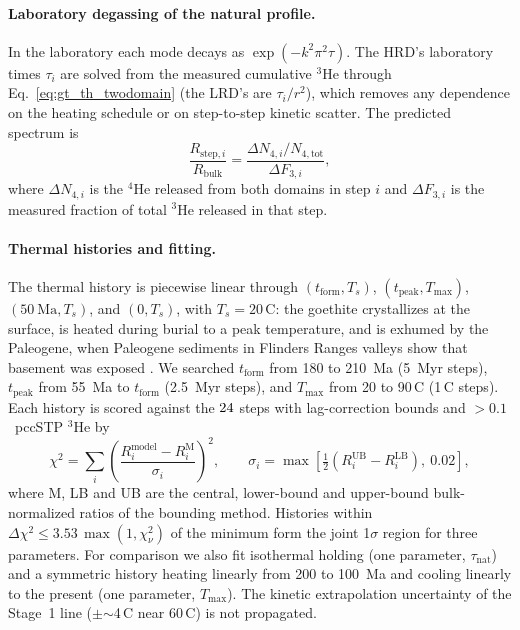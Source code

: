 \paragraph{Laboratory degassing of the natural profile.}
In the laboratory each mode decays as $\exp(-k^2\pi^2\tau)$. The HRD's
laboratory times $\tau_i$ are solved from the measured cumulative $^3$He
through Eq.~\ref{eq:gt_th_twodomain} (the LRD's are $\tau_i/r^2$), which removes
any dependence on the heating schedule or on step-to-step kinetic scatter. The
predicted spectrum is
\begin{equation}
  \frac{R_{\mathrm{step},i}}{R_\mathrm{bulk}} =
  \frac{\Delta N_{4,i}/N_{4,\mathrm{tot}}}{\Delta F_{3,i}},
  \label{eq:gt_th_ratio}
\end{equation}
where $\Delta N_{4,i}$ is the $^4$He released from both domains in step $i$
and $\Delta F_{3,i}$ is the measured fraction of total $^3$He released in that
step.

\paragraph{Thermal histories and fitting.}
The thermal history is piecewise linear through
$(t_\mathrm{form}, T_s)$, $(t_\mathrm{peak}, T_\mathrm{max})$, $(50~\mathrm{Ma}, T_s)$,
and $(0, T_s)$, with $T_s = 20$\,\textdegree C: the goethite crystallizes at
the surface, is heated during burial to a peak temperature, and is exhumed by
the Paleogene, when Paleogene sediments in Flinders Ranges valleys show that
basement was exposed \citep{mitchell1998}. We searched $t_\mathrm{form}$ from
180 to 210~Ma (5~Myr steps), $t_\mathrm{peak}$ from 55~Ma to $t_\mathrm{form}$
(2.5~Myr steps), and $T_\mathrm{max}$ from 20 to 90\,\textdegree C (1\,\textdegree C
steps). Each history is scored against the $24$ steps with
lag-correction bounds and $>0.1$~pccSTP $^3$He by
\begin{equation}
  \chi^2 = \sum_i\left(\frac{R^{\mathrm{model}}_i - R^{\mathrm{M}}_i}{\sigma_i}\right)^2,
  \qquad \sigma_i = \max\!\left[\tfrac{1}{2}\left(R^{\mathrm{UB}}_i-R^{\mathrm{LB}}_i\right),\ 0.02\right],
  \label{eq:gt_th_chi2}
\end{equation}
where M, LB and UB are the central, lower-bound and upper-bound
bulk-normalized ratios of the bounding method. Histories within
$\Delta\chi^2 \le 3.53\,\max(1,\chi^2_\nu)$ of the minimum form the joint
1$\sigma$ region for three parameters. For comparison we also fit isothermal
holding (one parameter, $\tau_\mathrm{nat}$) and a symmetric history heating
linearly from 200 to 100~Ma and cooling linearly to the present (one
parameter, $T_\mathrm{max}$). The kinetic extrapolation uncertainty of the
Stage~1 line ($\pm$$\sim$4\,\textdegree C near 60\,\textdegree C) is not
propagated.

